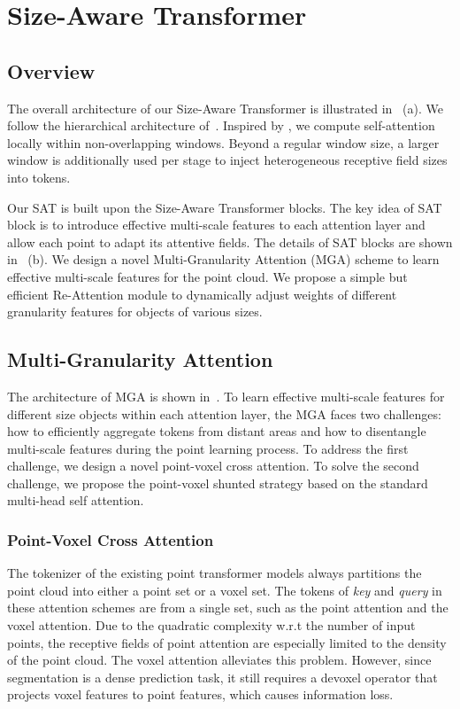\documentclass[10pt,twocolumn,letterpaper]{article}
\begin{document}
\section{Size-Aware Transformer}


\subsection{Overview}
The overall architecture of our Size-Aware Transformer is illustrated in~ (a). We follow the hierarchical architecture of~\cite{pointnet2}. Inspired by \cite{swin2d2021,strTransformer}, we compute self-attention locally within non-overlapping windows. Beyond a regular window size, a larger window is additionally used per stage to inject heterogeneous receptive field sizes into tokens. 

Our SAT is built upon the Size-Aware Transformer blocks. The key idea of SAT block is to introduce effective multi-scale features to each attention layer and allow each point to adapt its attentive fields. The details of SAT blocks are shown in~ (b). We design a novel Multi-Granularity Attention (MGA) scheme to learn effective multi-scale features for the point cloud. We propose a simple but efficient Re-Attention module to dynamically adjust weights of different granularity features for objects of various sizes.


\subsection{Multi-Granularity Attention}\label{sec_MGA}

The architecture of MGA is shown in~. To learn effective multi-scale features for different size objects within each attention layer, the MGA faces two challenges: how to efficiently aggregate tokens from distant areas and how to disentangle multi-scale features during the point learning process. To address the first challenge, we design a novel point-voxel cross attention. To solve the second challenge, we propose the point-voxel shunted strategy based on the standard multi-head self attention.


\subsubsection{Point-Voxel Cross Attention}\label{sec-pvca}


\quad The tokenizer of the existing point transformer models always partitions the point cloud into either a point set or a voxel set. The tokens of \textit{key} and \textit{query} in these attention schemes are from a single set, such as the point attention and the voxel attention. Due to the quadratic complexity w.r.t the number of input points, the receptive fields of point attention are especially limited to the density of the point cloud. The voxel attention alleviates this problem. However, since segmentation is a dense prediction task, it still requires a devoxel operator that projects voxel features to point features, which causes information loss.
\end{document}
